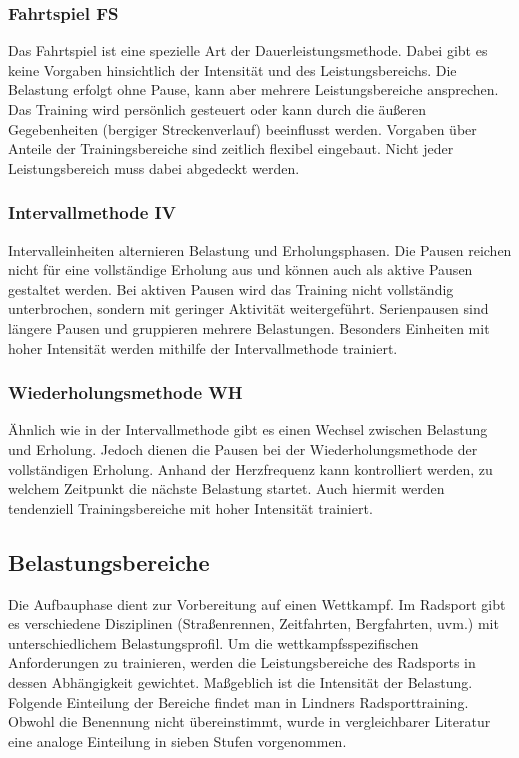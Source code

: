 \subsubsection{Fahrtspiel FS}
Das Fahrtspiel ist eine spezielle Art der Dauerleistungsmethode. Dabei gibt es keine Vorgaben hinsichtlich der Intensität und des Leistungsbereichs. Die Belastung erfolgt ohne Pause, kann aber mehrere Leistungsbereiche ansprechen. Das Training wird persönlich gesteuert oder kann durch die äußeren Gegebenheiten (bergiger Streckenverlauf) beeinflusst werden. Vorgaben über Anteile der Trainingsbereiche sind zeitlich flexibel eingebaut. Nicht jeder Leistungsbereich muss dabei abgedeckt werden. 
\subsubsection{Intervallmethode IV}
Intervalleinheiten alternieren Belastung und Erholungsphasen. Die Pausen reichen nicht für eine vollständige Erholung aus und können auch als aktive Pausen gestaltet werden. Bei aktiven Pausen wird das Training nicht vollständig unterbrochen, sondern mit geringer Aktivität weitergeführt. Serienpausen sind längere Pausen und gruppieren mehrere Belastungen. Besonders Einheiten mit hoher Intensität werden mithilfe der Intervallmethode trainiert. 
\subsubsection{Wiederholungsmethode WH}
Ähnlich wie in der Intervallmethode gibt es einen Wechsel zwischen Belastung und Erholung. Jedoch dienen die Pausen bei der Wiederholungsmethode der vollständigen Erholung. Anhand der Herzfrequenz kann kontrolliert werden, zu welchem Zeitpunkt die nächste Belastung startet. Auch hiermit werden tendenziell Trainingsbereiche mit hoher Intensität trainiert.

\subsection{Belastungsbereiche}
\label{grundlagen:sport:belastungsbereiche}
Die Aufbauphase dient zur Vorbereitung auf einen Wettkampf. Im Radsport gibt es verschiedene Disziplinen (Straßenrennen, Zeitfahrten, Bergfahrten, uvm.) mit unterschiedlichem Belastungsprofil. Um die wettkampfsspezifischen Anforderungen zu trainieren, werden die Leistungsbereiche des Radsports in dessen Abhängigkeit gewichtet.  Maßgeblich ist die Intensität der Belastung. Folgende Einteilung der Bereiche findet man in Lindners Radsporttraining. \cite[31-39]{Radsporttraining} Obwohl die Benennung nicht übereinstimmt, wurde in vergleichbarer Literatur \cite[27]{Ausdauertrainer} eine analoge Einteilung in sieben Stufen vorgenommen.
